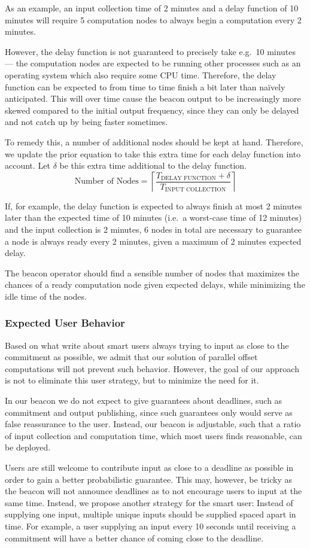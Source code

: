 \noindent
As an example, an input collection time of 2 minutes and a delay function of 10 minutes will require 5 computation nodes to always begin a computation every 2 minutes.

However, the delay function is not guaranteed to precisely take e.g.\ 10 minutes --- the computation nodes are expected to be running other processes such as an operating system which also require some CPU time.
Therefore, the delay function can be expected to from time to time finish a bit later than naïvely anticipated.
This will over time cause the beacon output to be increasingly more skewed compared to the initial output frequency, since they can only be delayed and not catch up by being faster sometimes.

To remedy this, a number of additional nodes should be kept at hand.
Therefore, we update the prior equation to take this extra time for each delay function into account.
Let $\delta$ be this extra time additional to the delay function.
\begin{equation*}
    \text{Number of Nodes} = \left\lceil\frac{T_\text{DELAY FUNCTION}+\delta}{T_\text{INPUT COLLECTION}}\right\rceil
\end{equation*}

\noindent
If, for example, the delay function is expected to always finish at most 2 minutes later than the expected time of 10 minutes (i.e.\ a worst-case time of 12 minutes) and the input collection is 2 minutes, 6 nodes in total are necessary to guarantee a node is always ready every 2 minutes, given a maximum of 2 minutes expected delay.

The beacon operator should find a sensible number of nodes that maximizes the chances of a ready computation node given expected delays, while minimizing the idle time of the nodes.

\subsubsection{Expected User Behavior}
Based on what \citet{randomzoo} write about smart users always trying to input as close to the commitment as possible, we admit that our solution of parallel offset computations will not prevent such behavior.
However, the goal of our approach is not to eliminate this user strategy, but to minimize the need for it.

In our beacon we do not expect to give guarantees about deadlines, such as commitment and output publishing, since such guarantees only would serve as false reassurance to the user.
Instead, our beacon is adjustable, such that a ratio of input collection and computation time, which most users finds reasonable, can be deployed.

Users are still welcome to contribute input as close to a deadline as possible in order to gain a better probabilistic guarantee.
This may, however, be tricky as the beacon will not announce deadlines as to not encourage users to input at the same time.
Instead, we propose another strategy for the smart user: Instead of supplying one input, multiple unique inputs should be supplied spaced apart in time.
For example, a user supplying an input every 10 seconds until receiving a commitment will have a better chance of coming close to the deadline.
